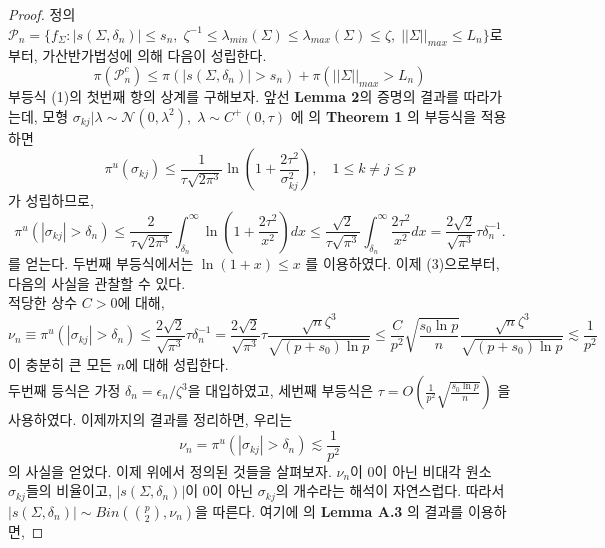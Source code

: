 \begin{proof}
    정의 $\mathcal{P}_n = \{ f_{\Sigma} : |s(\Sigma, \delta_n)| \leq s_n, \; \zeta^{-1} \leq \lambda_{min}(\Sigma) \leq \lambda_{max}(\Sigma) \leq \zeta, \; || \Sigma ||_{max} \leq L_n \}$로부터, 가산반가법성에 의해 다음이 성립한다.
    \begin{equation}
      \pi(\mathcal{P}_n^c) \leq \pi(|s(\Sigma, \delta_n)| > s_n) + \pi(||\Sigma||_{max} > L_n)  
    \end{equation}
    부등식 (1)의 첫번째 항의 상계를 구해보자. 앞선 \textbf{Lemma 2}의 증명의 결과를 따라가는데, 모형 $\sigma_{kj} | \lambda \sim \mathcal{N}(0, \lambda^2), \; \lambda \sim C^{+}(0, \tau)$ 에 \cite{carvalho2010horseshoe} 의 \textbf{Theorem 1} 의 부등식을 적용하면
    \begin{equation}
      \pi^u(\sigma_{kj}) \leq \frac{1}{\tau \sqrt{2 \pi^3}} \ln{ \left( 1 + \frac{2 \tau^2}{\sigma_{kj}^2} \right)}, \quad 1 \leq k \neq j \leq p
    \end{equation}
    가 성립하므로,
    \begin{equation}
      \pi^u(|\sigma_{kj}| > \delta_n) \leq \frac{2}{\tau \sqrt{2 \pi^3}} \int_{\delta_n}^{\infty} \ln{ \left( 1 + \frac{2 \tau^2}{x^2} \right)} dx \leq \frac{\sqrt{2}}{\tau \sqrt{\pi^3}} \int_{\delta_n}^{\infty} \frac{2\tau^2}{x^2} dx = \frac{2 \sqrt{2}}{\sqrt{\pi^3}} \tau \delta_n^{-1}.
    \end{equation}
    를 얻는다. 두번째 부등식에서는 $\ln{(1 + x)} \leq x$ 를 이용하였다. 이제 (3)으로부터, 다음의 사실을 관찰할 수 있다. \\
    적당한 상수 $C > 0$에 대해,
    \begin{equation}
      \nu_n \equiv \pi^u (|\sigma_{kj}| > \delta_n) \leq \frac{2 \sqrt{2}}{\sqrt{\pi^3}} \tau \delta_n^{-1} = \frac{2\sqrt{2}}{\sqrt{\pi^3}} \tau \frac{\sqrt{n} \zeta^3}{\sqrt{(p+s_0)\ln{p}}} \leq \frac{C}{p^2} \sqrt{\frac{s_0 \ln{p}}{n}} \frac{\sqrt{n} \zeta^3}{\sqrt{(p+s_0)\ln{p}}} \lesssim \frac{1}{p^2}
    \end{equation}
    이 충분히 큰 모든 $n$에 대해 성립한다.  \\
    두번째 등식은 가정 $\delta_n = \epsilon_n/\zeta^3$을 대입하였고, 세번째 부등식은 $\tau = O(\frac{1}{p^2} \sqrt{\frac{s_0 \ln{p}}{n}})$ 을 사용하였다.
    이제까지의 결과를 정리하면, 우리는
    \begin{equation}
      \nu_n = \pi^u ( |\sigma_{kj}| > \delta_n ) \lesssim \frac{1}{p^2}
    \end{equation}
    의 사실을 얻었다. 이제 위에서 정의된 것들을 살펴보자. $\nu_n$이 0이 아닌 비대각 원소 $\sigma_{kj}$들의 비율이고, $|s(\Sigma, \delta_n)|$이 0이 아닌 $\sigma_{kj}$의 개수라는 해석이 자연스럽다. 따라서 $|s(\Sigma, \delta_n)| \sim Bin( {p \choose 2}, \nu_n)$을 따른다. 여기에 \cite{song2017nearly} 의 \textbf{Lemma A.3} 의 결과를 이용하면,

\end{proof}
